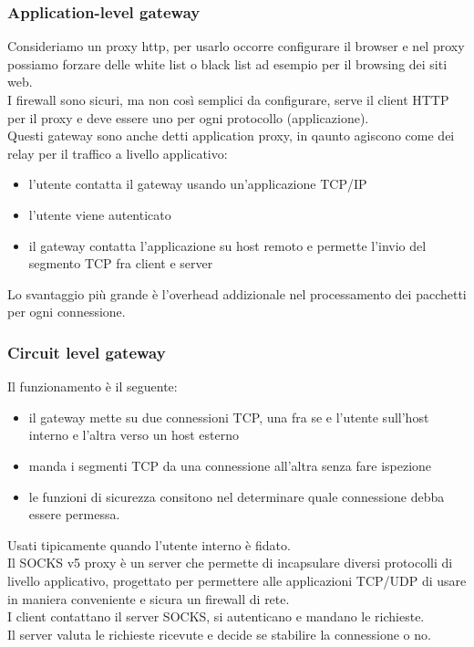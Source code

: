 \documentclass[12pt, oneside]{extbook} %
\begin{document}
\subsubsection{Application-level gateway}
Consideriamo un proxy http, per usarlo occorre configurare il browser e nel proxy possiamo forzare delle white list o black list ad esempio per il browsing dei siti web.
\\I firewall sono sicuri, ma non così semplici da configurare, serve il client HTTP per il proxy e deve essere uno per ogni protocollo (applicazione).\\
Questi gateway sono anche detti application proxy, in qaunto agiscono come dei relay per il traffico a livello applicativo:
\begin{itemize}
    \item l'utente contatta il gateway usando un'applicazione TCP/IP
    \item l'utente viene autenticato
    \item il gateway contatta l'applicazione su host remoto e permette l'invio del segmento TCP fra client e server
\end{itemize}
Lo svantaggio più grande è l'overhead addizionale nel processamento dei pacchetti per ogni connessione.

\subsubsection{Circuit level gateway}
Il funzionamento è il seguente:
\begin{itemize}
    \item il gateway mette su due connessioni TCP, una fra se e l'utente sull'host interno e l'altra verso un host esterno
    \item manda i segmenti TCP da una connessione all'altra senza fare ispezione
    \item le funzioni di sicurezza consitono nel determinare quale connessione debba essere permessa. 
\end{itemize}
Usati tipicamente quando l'utente interno è fidato.
\\Il SOCKS v5 proxy è un server che permette di incapsulare diversi protocolli di livello applicativo, progettato per permettere alle applicazioni TCP/UDP di usare in maniera conveniente e sicura un firewall di rete.
\\I client contattano il server SOCKS, si autenticano e mandano le richieste.
\\Il server valuta le richieste ricevute e decide se stabilire la connessione o no.
\end{document}

